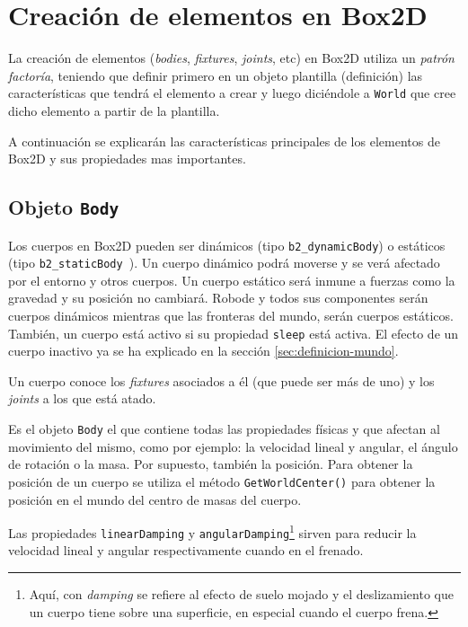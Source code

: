\chapter{Creación de elementos en Box2D}
\label{anexo:creacion-elementos-box2d}


La creación de elementos (\emph{bodies}, \emph{fixtures}, \emph{joints}, etc) en Box2D utiliza un \emph{patrón factoría}, teniendo que definir primero en un objeto plantilla (definición) las características que tendrá el elemento a crear y luego diciéndole a \texttt{World} que cree dicho elemento a partir de la plantilla.

A continuación se explicarán las características principales de los elementos de Box2D y sus propiedades mas importantes.

\section*{Objeto \texttt{Body}}

Los cuerpos en Box2D pueden ser dinámicos (tipo \texttt{b2\_dynamicBody}) o estáticos (tipo \texttt{b2\_staticBody }). Un cuerpo dinámico podrá moverse y se verá afectado por el entorno y otros cuerpos. Un cuerpo estático será inmune a fuerzas como la gravedad y su posición no cambiará. Robode y todos sus componentes serán cuerpos dinámicos mientras que las fronteras del mundo, serán cuerpos estáticos. También, un cuerpo está activo si su propiedad \texttt{sleep} está activa. El efecto de un cuerpo inactivo ya se ha explicado en la sección \ref{sec:definicion-mundo}.

Un cuerpo conoce los \emph{fixtures} asociados a él (que puede ser más de uno) y los \emph{joints} a los que está atado.

Es el objeto \texttt{Body} el que contiene todas las propiedades físicas y que afectan al movimiento del mismo, como por ejemplo: la velocidad lineal y angular, el ángulo de rotación o la masa. Por supuesto, también la posición. Para obtener la posición de un cuerpo se utiliza el método \texttt{GetWorldCenter()} para obtener la posición en el mundo del centro de masas del cuerpo.


Las propiedades \texttt{linearDamping} y \texttt{angularDamping}\footnote{Aquí, con \emph{damping} se refiere al efecto de suelo mojado y el deslizamiento que un cuerpo tiene sobre una superficie, en especial cuando el cuerpo frena.} sirven para reducir la velocidad lineal y angular respectivamente cuando en el frenado.

